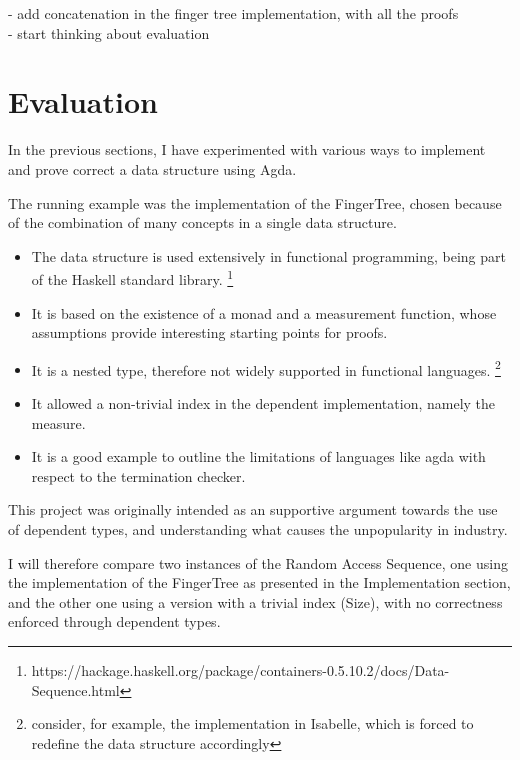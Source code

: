 \documentclass[12pt,twoside,notitlepage]{report}
\begin{document}
- add concatenation in the finger tree implementation, with all the proofs \\
- start thinking about evaluation \\

\chapter{Evaluation}

In the previous sections, I have experimented with various ways to implement and prove correct a data structure using Agda. 

The running example was the implementation of the FingerTree, chosen because of the combination of many concepts in a single data structure.

\begin{itemize}
\item The data structure is used extensively in functional programming, being part of the Haskell standard library. \footnote{https://hackage.haskell.org/package/containers-0.5.10.2/docs/Data-Sequence.html}

\item It is based on the existence of a monad and a measurement function, whose assumptions provide interesting starting points for proofs.

\item It is a nested type, therefore not widely supported in functional languages. \footnote{consider, for example, the implementation in Isabelle, which is forced to redefine the data structure accordingly}

\item It allowed a non-trivial index in the dependent implementation, namely the measure.

\item It is a good example to outline the limitations of languages like agda with respect to the termination checker.
\end{itemize}

This project was originally intended as an supportive argument towards the use of dependent types, and understanding what causes the unpopularity in industry.

I will therefore compare two instances of the Random Access Sequence, one using the implementation of the FingerTree as presented in the Implementation section, and the other one using a version with a trivial index (Size), with no correctness enforced through dependent types.
\end{document}
